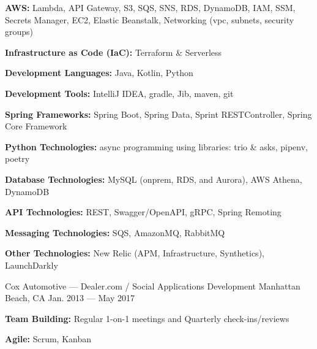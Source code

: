 \vspace{-2.00mm}
\begin{cventries}

    {} %
    {} %
    {} %
    {%
      \begin{cvitems} %
        \item {\textbf{AWS:} Lambda, API Gateway, S3, SQS, SNS, RDS, DynamoDB, IAM, SSM, Secrets Manager, EC2, Elastic Beanstalk, Networking (vpc, subnets, security groups)}
        \item {\textbf{Infrastructure as Code (IaC):} Terraform \& Serverless}
        \item {\textbf{Development Languages:} Java, Kotlin, Python}
        \item {\textbf{Development Tools:} IntelliJ IDEA, gradle, Jib, maven, git}
        \item {\textbf{Spring Frameworks:} Spring Boot, Spring Data, Sprint RESTController, Spring Core Framework}
        \item {\textbf{Python Technologies:} async programming using libraries: trio \& asks, pipenv, poetry}
        \item {\textbf{Database Technologies:} MySQL (onprem, RDS, and Aurora), AWS Athena, DynamoDB}
        \item {\textbf{API Technologies:} REST, Swagger/OpenAPI, gRPC, Spring Remoting}
        \item {\textbf{Messaging Technologies:} SQS, AmazonMQ, RabbitMQ}
        \item {\textbf{Other Technologies:} New Relic (APM, Infrastructure, Synthetics), LaunchDarkly}
      \end{cvitems}
    }


    {Cox Automotive --- Dealer.com / Social Applications Development} %
    {Manhattan Beach, CA} %
    {Jan. 2013 --- May 2017} %
    {}
    \vspace{-6.00mm}

    {} %
    {} %
    {} %
    {\vspace{-0.5mm}
      \begin{cvitems} %
        \item {\textbf{Team Building:} Regular 1-on-1 meetings and Quarterly check-ins/reviews}
        \item {\textbf{Agile:} Scrum, Kanban}
      \end{cvitems}
    }


\end{cventries}
